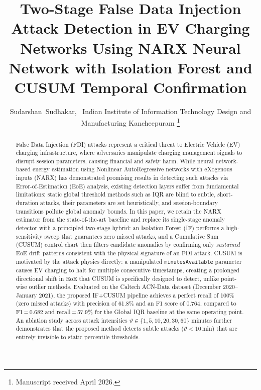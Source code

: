 \documentclass[journal]{IEEEtran}
\newcommand{\cusum}{CUSUM}
\begin{document}
\title{Two-Stage False Data Injection Attack Detection in EV Charging
Networks Using NARX Neural Network with Isolation Forest and CUSUM
Temporal Confirmation}

\author{Sudarshan~Sudhakar,~\IEEEmembership{}
Indian Institute of Information Technology Design and Manufacturing
Kancheepuram
\thanks{Manuscript received April 2026.}
}

\maketitle

\begin{abstract}
False Data Injection (FDI) attacks represent a critical threat to
Electric Vehicle (EV) charging infrastructure, where adversaries
manipulate charging management signals to disrupt session parameters,
causing financial and safety harm. While neural network-based energy
estimation using Nonlinear AutoRegressive networks with eXogenous inputs
(NARX) has demonstrated promising results in detecting such attacks via
Error-of-Estimation (EoE) analysis, existing detection layers suffer
from fundamental limitations: static global threshold methods such as
IQR are blind to subtle, short-duration attacks, their parameters are
set heuristically, and session-boundary transitions pollute global
anomaly bounds. In this paper, we retain the NARX estimator from the
state-of-the-art baseline and replace its single-stage anomaly detector
with a principled two-stage hybrid: an Isolation Forest (IF) performs a
high-sensitivity sweep that guarantees zero missed attacks, and a
Cumulative Sum (\cusum{}) control chart then filters candidate anomalies by
confirming only \emph{sustained} EoE drift patterns consistent with
the physical signature of an FDI attack. CUSUM is motivated by the
attack physics directly: a manipulated \texttt{minutesAvailable}
parameter causes EV charging to halt for multiple consecutive
timestamps, creating a prolonged directional shift in EoE that CUSUM is
specifically designed to detect, unlike point-wise outlier methods.
Evaluated on the Caltech ACN-Data dataset (December 2020--January 2021),
the proposed IF+\cusum{} pipeline achieves a perfect recall of 100\%
(zero missed attacks) with precision of 61.8\% and an F1 score of 0.764,
compared to F1\,=\,0.682 and recall\,=\,57.9\% for the Global IQR
baseline at the same operating point. An ablation study across attack
intensities $\vartheta\in\{1,5,10,20,30,60\}$ minutes further
demonstrates that the proposed method detects subtle attacks
($\vartheta < 10$\,min) that are entirely invisible to static
percentile thresholds.
\end{abstract}
\end{document}

